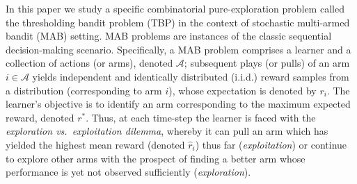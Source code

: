 In this paper we study a specific combinatorial pure-exploration problem called the thresholding bandit problem (TBP) in the context of stochastic multi-armed bandit (MAB) setting. MAB problems are instances of the classic sequential decision-making scenario. Specifically, a MAB problem comprises a learner and a collection of actions (or arms), denoted $\mathcal{A}$; subsequent plays (or pulls) of an arm $i\in\mathcal{A}$ yields independent and identically distributed (i.i.d.) reward samples from a distribution (corresponding to arm $i$), whose expectation is denoted by $r_i$. 
The learner's objective is to identify an arm corresponding to the maximum expected reward, denoted $r^{*}$. Thus, at each time-step the learner 
is faced with the \emph{exploration vs.\ exploitation dilemma}, whereby it can pull an arm which has yielded the highest mean reward (denoted $\hat{r}_{i}$) thus far (\emph{exploitation}) or continue to explore other arms with the prospect of finding a better arm 
whose performance is yet not observed sufficiently (\emph{exploration}).


